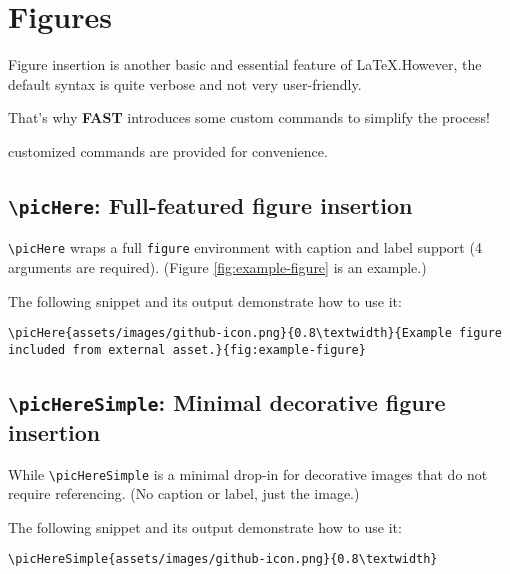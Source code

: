 \newpage
\section{Figures}

Figure insertion is another basic and essential feature of {\LaTeX}.However, the default syntax is quite verbose and not very user-friendly.

That's why \textbf{FAST} introduces some custom commands to simplify the process!

 customized commands are provided for convenience. 

\subsection{\texttt{\textbackslash picHere}: Full-featured figure insertion}

\texttt{\textbackslash picHere} wraps a full \texttt{figure} environment with caption and label support (4 arguments are required). (Figure \ref{fig:example-figure} is an example.)

\noindent The following snippet and its output demonstrate how to use it:

\begin{lstlisting}[style=githubLight, language={[LaTeX]TeX}, label={lst:figure-helper-macros}]
\picHere{assets/images/github-icon.png}{0.8\textwidth}{Example figure included from external asset.}{fig:example-figure}
\end{lstlisting}


\subsection{\texttt{\textbackslash picHereSimple}: Minimal decorative figure insertion}

While \texttt{\textbackslash picHereSimple} is a minimal drop-in for decorative images that do not require referencing. (No caption or label, just the image.)

\noindent The following snippet and its output demonstrate how to use it:

\begin{lstlisting}[style=githubLight, language={[LaTeX]TeX}, label={lst:figure-helper-macros-2}]
    \picHereSimple{assets/images/github-icon.png}{0.8\textwidth}
\end{lstlisting}

